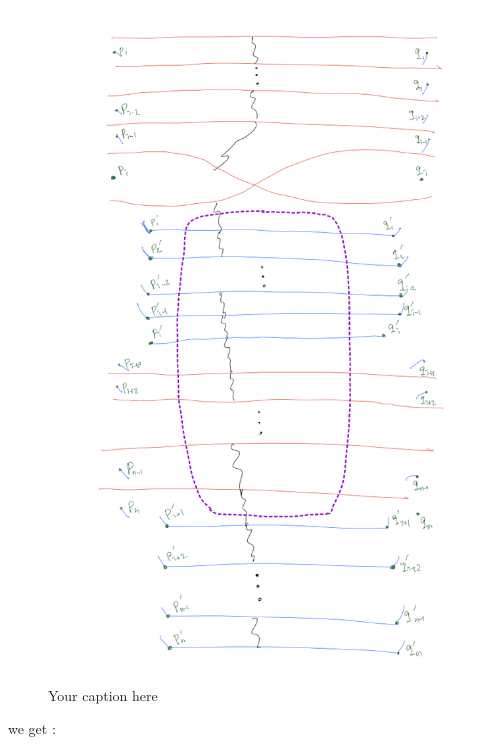 \begin{figure}[H] %
    \centering
    \includegraphics[width=\linewidth]{diagrams/definition12/15.png} %
    \caption{Your caption here}
    \label{fig:your-label}
\end{figure}

we get :

